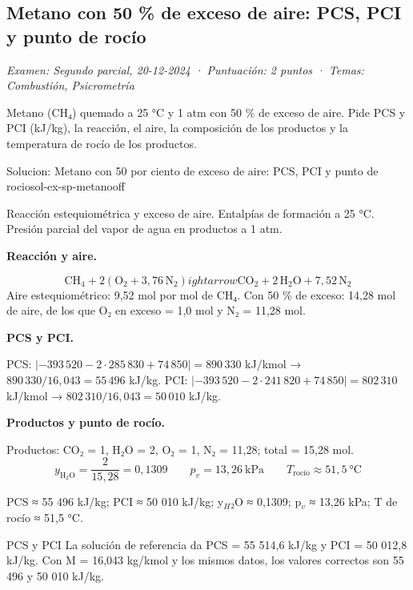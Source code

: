 \documentclass[11pt,a4paper]{article}
\begin{document}
\subsection{Metano con 50 \% de exceso de aire: PCS, PCI y punto de rocío}
\noindent\textit{Examen: Segundo parcial, 20-12-2024 · Puntuación: 2 puntos · Temas: Combustión, Psicrometría}\par\medskip

Metano (CH₄) quemado a 25 °C y 1 atm con 50 \% de exceso de aire. Pide PCS y PCI (kJ/kg), la reacción, el aire, la composición de los productos y la temperatura de rocío de los productos.

\begin{ocg}{Solucion: Metano con 50  por ciento de exceso de aire: PCS, PCI y punto de rocio}{sol-ex-sp-metano}{off}
\begin{antesbox}
Reacción estequiométrica y exceso de aire. Entalpías de formación a 25 °C. Presión parcial del vapor de agua en productos a 1 atm.
\end{antesbox}

\par\medskip\noindent\textbf{Reacción y aire.}\par
\[\mathrm{CH_4} + 2(\mathrm{O_2} + 3{,}76\,\mathrm{N_2}) ightarrow \mathrm{CO_2} + 2\,\mathrm{H_2O} + 7{,}52\,\mathrm{N_2}\]  Aire estequiométrico: 9,52 mol por mol de CH₄. Con 50 \% de exceso: 14,28 mol de aire, de los que O₂ en exceso = 1,0 mol y N₂ = 11,28 mol.

\par\medskip\noindent\textbf{PCS y PCI.}\par
PCS:  $|{-393\,520} - 2\cdot 285\,830 + 74\,850| = 890\,330$  kJ/kmol →  $890\,330/16{,}043 = 55\,496$  kJ/kg. PCI:  $|{-393\,520} - 2\cdot 241\,820 + 74\,850| = 802\,310$  kJ/kmol →  $802\,310/16{,}043 = 50\,010$  kJ/kg.

\par\medskip\noindent\textbf{Productos y punto de rocío.}\par
Productos: CO₂ = 1, H₂O = 2, O₂ = 1, N₂ = 11,28; total = 15,28 mol.  \[y_{\text{H}_2\text{O}} = \frac{2}{15{,}28} = 0{,}1309 \qquad p_v = 13{,}26\ \text{kPa} \qquad T_{\text{rocío}} \approx 51{,}5\ \text{°C}\]

\begin{resbox}
PCS ≈ 55 496 kJ/kg; PCI ≈ 50 010 kJ/kg; y$_{H}$₂O ≈ 0,1309; p$_{v}$ ≈ 13,26 kPa; T de rocío ≈ 51,5 °C.
\end{resbox}

\begin{ojobox}{PCS y PCI}
La solución de referencia da PCS = 55 514,6 kJ/kg y PCI = 50 012,8 kJ/kg. Con M = 16,043 kg/kmol y los mismos datos, los valores correctos son 55 496 y 50 010 kJ/kg.
\end{ojobox}


\end{ocg}
\end{document}
